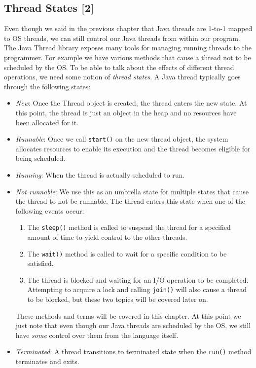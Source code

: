 \documentclass[main.tex]{subfiles}
\begin{document}
\subsection{Thread States [2]}
Even though we said in the previous chapter that Java threads are 1-to-1 mapped to OS threads, we can still control our Java threads from within our program. The Java Thread library exposes many tools for managing running threads to the programmer. For example we have various methods that cause a thread not to be scheduled by the OS. To be able to talk about the effects of different thread operations, we need some notion of \textit{thread states}. A Java thread typically goes through the following states:
\begin{itemize}
    \item \textit{New}: Once the Thread object is created, the thread enters the new state. At this point, the thread is just an object in the heap and no resources have been allocated for it.
    \item \textit{Runnable}: Once we call \texttt{start()} on the new thread object, the system allocates resources to enable its execution and the thread becomes eligible for being scheduled.
    \item \textit{Running}: When the thread is actually scheduled to run.
    \item \textit{Not runnable}: We use this as an umbrella state for multiple states that cause the thread to not be runnable. The thread enters this state when one of the following events occur:
          \begin{enumerate}
              \item The \texttt{sleep()} method is called to suspend the thread for a specified amount of time to yield control to the other threads.
              \item The \texttt{wait()} method is called to wait for a specific condition to be satisfied.
              \item The thread is blocked and waiting for an I/O operation to be completed. Attempting to acquire a lock and calling \texttt{join()} will also cause a thread to be blocked, but these two topics will be covered later on.
          \end{enumerate}
          These methods and terms will be covered in this chapter. At this point we just note that even though our Java threads are scheduled by the OS, we still have \textit{some} control over them from the language itself.
    \item \textit{Terminated}: A thread transitions to terminated state when the \texttt{run()} method terminates and exits.
\end{itemize}
\end{document}
